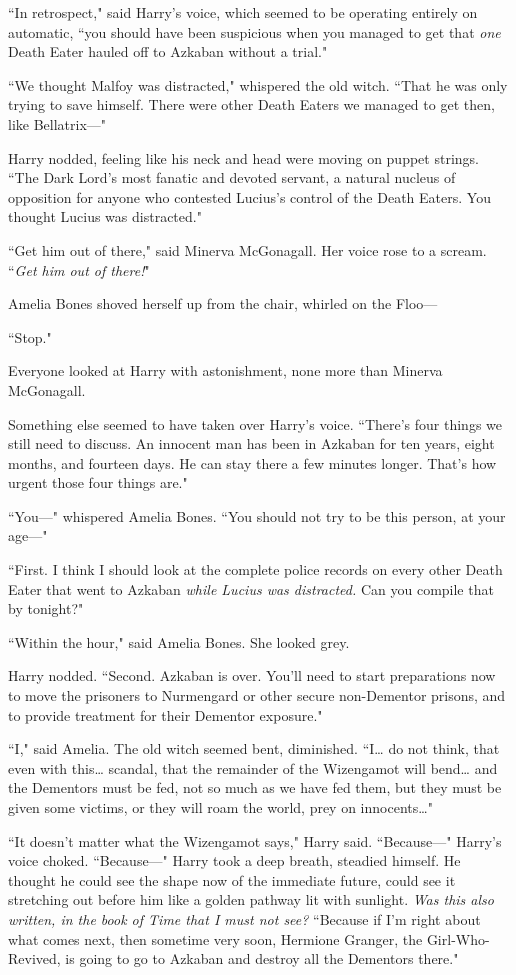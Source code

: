 ``In retrospect," said Harry's voice, which seemed to be operating entirely on automatic, ``you should have been suspicious when you managed to get that \emph{one} Death Eater hauled off to Azkaban without a trial."

``We thought Malfoy was distracted," whispered the old witch. ``That he was only trying to save himself. There were other Death Eaters we managed to get then, like Bellatrix—"

Harry nodded, feeling like his neck and head were moving on puppet strings. ``The Dark Lord's most fanatic and devoted servant, a natural nucleus of opposition for anyone who contested Lucius's control of the Death Eaters. You thought Lucius was distracted."

``Get him out of there," said Minerva McGonagall. Her voice rose to a scream. ``\emph{Get him out of there!}"

Amelia Bones shoved herself up from the chair, whirled on the Floo—

``Stop."

Everyone looked at Harry with astonishment, none more than Minerva McGonagall.

Something else seemed to have taken over Harry's voice. ``There's four things we still need to discuss. An innocent man has been in Azkaban for ten years, eight months, and fourteen days. He can stay there a few minutes longer. That's how urgent those four things are."

``You—" whispered Amelia Bones. ``You should not try to be this person, at your age—"

``First. I think I should look at the complete police records on every other Death Eater that went to Azkaban \emph{while Lucius was distracted.} Can you compile that by tonight?"

``Within the hour," said Amelia Bones. She looked grey.

Harry nodded. ``Second. Azkaban is over. You'll need to start preparations now to move the prisoners to Nurmengard or other secure non-Dementor prisons, and to provide treatment for their Dementor exposure."

``I," said Amelia. The old witch seemed bent, diminished. ``I{\ldots} do not think, that even with this{\ldots} scandal, that the remainder of the Wizengamot will bend{\ldots} and the Dementors must be fed, not so much as we have fed them, but they must be given some victims, or they will roam the world, prey on innocents{\ldots}"

``It doesn't matter what the Wizengamot says," Harry said. ``Because—" Harry's voice choked. ``Because—" Harry took a deep breath, steadied himself. He thought he could see the shape now of the immediate future, could see it stretching out before him like a golden pathway lit with sunlight. \emph{Was this also written, in the book of Time that I must not see?} ``Because if I'm right about what comes next, then sometime very soon, Hermione Granger, the Girl-Who-Revived, is going to go to Azkaban and destroy all the Dementors there."

